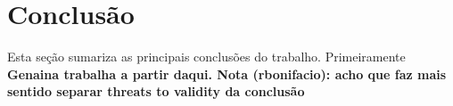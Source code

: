 \section{Conclus\~{a}o}\label{sec:conclusao}

Esta se\c c\~{a}o sumariza as principais conclus\~{o}es do
trabalho. Primeiramente {\bf Genaina trabalha a partir daqui. Nota
  (rbonifacio): acho que faz mais sentido separar threats to validity
  da conclus\~{a}o} 
